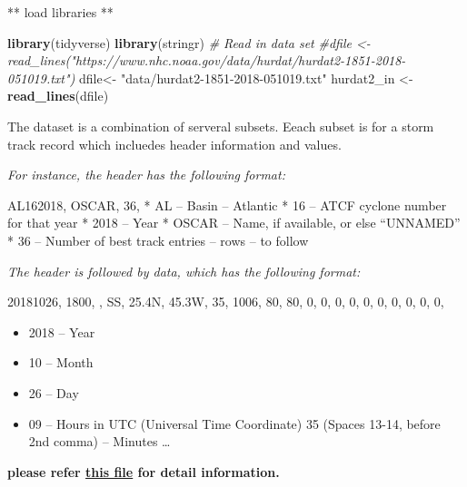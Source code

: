 \documentclass[]{book}
\newenvironment{Shaded}{\begin{snugshade}}{\end{snugshade}}
\newcommand{\CharTok}[1]{\textcolor[rgb]{0.31,0.60,0.02}{#1}}
\newcommand{\CommentTok}[1]{\textcolor[rgb]{0.56,0.35,0.01}{\textit{#1}}}
\newcommand{\DataTypeTok}[1]{\textcolor[rgb]{0.13,0.29,0.53}{#1}}
\newcommand{\DecValTok}[1]{\textcolor[rgb]{0.00,0.00,0.81}{#1}}
\newcommand{\KeywordTok}[1]{\textcolor[rgb]{0.13,0.29,0.53}{\textbf{#1}}}
\newcommand{\NormalTok}[1]{#1}
\newcommand{\OperatorTok}[1]{\textcolor[rgb]{0.81,0.36,0.00}{\textbf{#1}}}
\newcommand{\OtherTok}[1]{\textcolor[rgb]{0.56,0.35,0.01}{#1}}
\newcommand{\StringTok}[1]{\textcolor[rgb]{0.31,0.60,0.02}{#1}}
\providecommand{\tightlist}{%
  \setlength{\itemsep}{0pt}\setlength{\parskip}{0pt}}
\begin{document}
** load libraries **

\begin{Shaded}
\begin{Highlighting}[]
\KeywordTok{library}\NormalTok{(tidyverse)}
\KeywordTok{library}\NormalTok{(stringr)}
\CommentTok{# Read in data set}
\CommentTok{#dfile <- read_lines("https://www.nhc.noaa.gov/data/hurdat/hurdat2-1851-2018-051019.txt")}
\NormalTok{dfile<-}\StringTok{ "data/hurdat2-1851-2018-051019.txt"}
\NormalTok{hurdat2_in <-}\StringTok{ }\KeywordTok{read_lines}\NormalTok{(dfile)}
\end{Highlighting}
\end{Shaded}

The dataset is a combination of serveral subsets. Eeach subset is for a storm track record which incluedes header information and values.

\emph{For instance, the header has the following format:}

AL162018, OSCAR, 36,
* AL -- Basin -- Atlantic
* 16 -- ATCF cyclone number for that year
* 2018 -- Year
* OSCAR -- Name, if available, or else ``UNNAMED''
* 36 -- Number of best track entries -- rows -- to follow

\emph{The header is followed by data, which has the following format:}

20181026, 1800, , SS, 25.4N, 45.3W, 35, 1006, 80, 80, 0, 0, 0, 0, 0, 0, 0, 0, 0, 0,

\begin{itemize}
\tightlist
\item
  2018 -- Year
\item
  10 -- Month
\item
  26 -- Day
\item
  09 -- Hours in UTC (Universal Time Coordinate) 35 (Spaces 13-14, before 2nd comma) -- Minutes
  \ldots{}
\end{itemize}

\textbf{please refer \href{\%22https://www.nhc.noaa.gov/data/hurdat/hurdat2-format-atlantic.pdf\%22}{this file} for detail information.}

\begin{Shaded}
\end{Shaded}
\end{document}
